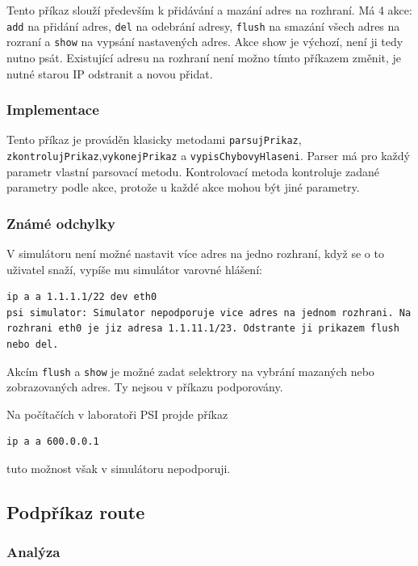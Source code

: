 Tento příkaz slouží především k přidávání a mazání adres na rozhraní. Má 4 akce: \verb|add| na přidání adres, \verb|del| na odebrání adresy, \verb|flush| na smazání všech adres na rozraní a \verb|show| na vypsání nastavených adres. Akce show je výchozí, není ji tedy nutno psát. Existující adresu na rozhraní není možno tímto příkazem změnit, je nutné starou IP odstranit a novou přidat.

\subsubsection{Implementace}

Tento příkaz je prováděn klasicky metodami \verb|parsujPrikaz|, \verb|zkontrolujPrikaz|,\linebreak \verb|vykonejPrikaz| a \verb|vypisChybovyHlaseni|. Parser má pro každý parametr vlastní parsovací metodu. Kontrolovací metoda kontroluje zadané parametry podle akce, protože u každé akce mohou být jiné parametry.

\subsubsection{Známé odchylky}

V simulátoru není možné nastavit více adres na jedno rozhraní, když se o to uživatel snaží, vypíše mu simulátor varovné hlášení:
\begin{verbatim}
ip a a 1.1.1.1/22 dev eth0
psi simulator: Simulator nepodporuje vice adres na jednom rozhrani. Na
rozhrani eth0 je jiz adresa 1.1.11.1/23. Odstrante ji prikazem flush nebo del.
\end{verbatim}

Akcím \verb|flush| a \verb|show| je možné zadat selektrory na vybrání mazaných nebo zobrazovaných adres. Ty nejsou v příkazu podporovány.

Na počítačích v laboratoři PSI projde příkaz
\begin{verbatim}
ip a a 600.0.0.1
\end{verbatim}
tuto možnost však v simulátoru nepodporuji.


\subsection{Podpříkaz route}

\subsubsection{Analýza}

